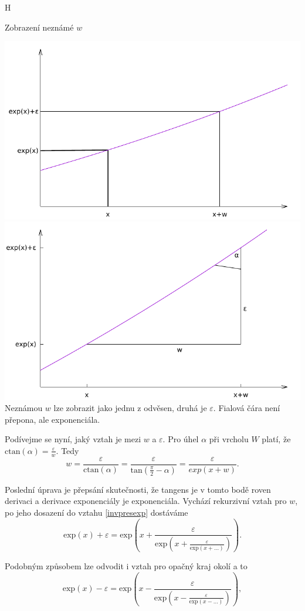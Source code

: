 \begin{myfigure}{H}
\caption{Zobrazení neznámé $w$}
\includegraphics[width=.5\linewidth]{graphics/exp5.pdf}\label{fig:exp5}
\includegraphics[width=.5\linewidth]{graphics/exp6.pdf}\label{fig:exp6}
Neznámou $w$ lze zobrazit jako jednu z odvěsen, druhá je $\varepsilon$. Fialová čára není přepona, ale exponenciála.
\end{myfigure}

Podívejme se nyní, jaký vztah je mezi $w$ a $\varepsilon$. Pro úhel $\alpha$ při vrcholu $W$ platí, že $\mathrm{ctan}(\alpha) = \frac{\varepsilon}{w}$. Tedy
\begin{equation}
w = \frac{\varepsilon}{\mathrm{ctan}(\alpha)} = \frac{\varepsilon}{\mathrm{tan}(\frac{\pi}{2}-\alpha)} = \frac{\varepsilon}{exp(x+w)}.
\end{equation}

Poslední úprava je přepsání skutečnosti, že tangens je v tomto bodě roven derivaci a derivace exponenciály je exponenciála. Vychází rekurzivní vztah pro $w$, po jeho dosazení do vztahu \ref{invpresexp} dostáváme
\begin{equation}\label{rekpresexp}
\mathrm{exp}(x)+\varepsilon=\mathrm{exp}\left(x+\frac{\varepsilon}{\mathrm{exp}\left(x+\frac{\varepsilon}{\mathrm{exp}(x+\ldots)}\right)}\right).
\end{equation}

Podobným způsobem lze odvodit i vztah pro opačný kraj okolí a to
\begin{equation}\label{rekpresexp2}
\mathrm{exp}(x)-\varepsilon=\mathrm{exp}\left(x-\frac{\varepsilon}{\mathrm{exp}\left(x-\frac{\varepsilon}{\mathrm{exp}(x-\ldots)}\right)}\right),
\end{equation}

